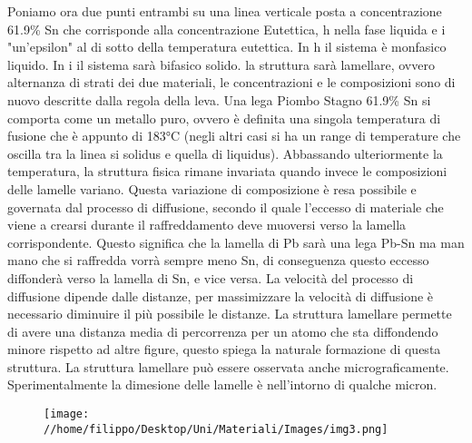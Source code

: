 \documentclass{article}%
\begin{document}
%
Poniamo ora due punti entrambi su una linea verticale posta a concentrazione 61.9\% Sn che corrisponde alla concentrazione Eutettica, h nella fase liquida e i "un'epsilon" al di sotto della temperatura eutettica.\newline%
%
In h il sistema è monfasico liquido.\newline%
%
In i il sistema sarà bifasico solido. la struttura sarà lamellare, ovvero alternanza di strati dei due materiali, le concentrazioni e le composizioni sono di nuovo descritte dalla regola della leva.\newline%
%
Una lega Piombo Stagno 61.9\% Sn si comporta come un metallo puro, ovvero è definita una singola temperatura di fusione che è appunto di 183°C (negli altri casi si ha un range di temperature che oscilla tra la linea si solidus e quella di liquidus).\newline%
%
Abbassando ulteriormente la temperatura, la struttura fisica rimane invariata quando invece le composizioni delle lamelle variano.\newline%
%
Questa variazione di composizione è resa possibile e governata dal processo di diffusione, secondo il quale l'eccesso di materiale che viene a crearsi durante il raffreddamento deve muoversi verso la lamella corrispondente.\newline%
%
Questo significa che la lamella di Pb sarà una lega Pb{-}Sn ma man mano che si raffredda vorrà sempre meno Sn, di conseguenza questo eccesso diffonderà verso la lamella di Sn, e vice versa.\newline%
%
La velocità del processo di diffusione dipende dalle distanze, per massimizzare la velocità di diffusione è necessario diminuire il più possibile le distanze.\newline%
%
La struttura lamellare permette di avere una distanza media di percorrenza per un atomo che sta diffondendo minore rispetto ad altre figure, questo spiega la naturale formazione di questa struttura.\newline%
%
\newline%
%
La struttura lamellare può essere osservata anche micrograficamente.\newline%
%
Sperimentalmente la dimesione delle lamelle è nell'intorno di qualche micron.\newline%
%
\newline%
%


\begin{figure}[H]%
\centering%
\texttt{[image: //home/filippo/Desktop/Uni/Materiali/Images/img3.png]}%
\end{figure}
\end{document}
